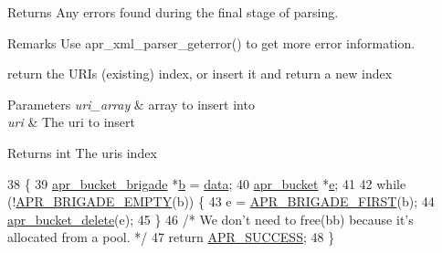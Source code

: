 \begin{DoxyReturn}{Returns}
Any errors found during the final stage of parsing. 
\end{DoxyReturn}
\begin{DoxyRemark}{Remarks}
Use apr\+\_\+xml\+\_\+parser\+\_\+geterror() to get more error information.
\end{DoxyRemark}
return the U\+RI\textquotesingle{}s (existing) index, or insert it and return a new index 
\begin{DoxyParams}{Parameters}
{\em uri\+\_\+array} & array to insert into \\
\hline
{\em uri} & The uri to insert \\
\hline
\end{DoxyParams}
\begin{DoxyReturn}{Returns}
int The uri\textquotesingle{}s index 
\end{DoxyReturn}

\begin{DoxyCode}
38 \{
39     \hyperlink{structapr__bucket__brigade}{apr\_bucket\_brigade} *\hyperlink{group__APACHE__CORE__PROTO_ga7fa09c5c80a7d25b74511944f5949e31}{b} = \hyperlink{group__APACHE__CORE__LOG_gae4950db1dbfff8459a712737063b61aa}{data};
40     \hyperlink{structapr__bucket}{apr\_bucket} *\hyperlink{group__APR__Util__Bucket__Brigades_gacd90314acb2c2e5cd19681136c08efac}{e};
41 
42     \textcolor{keywordflow}{while} (!\hyperlink{group__APR__Util__Bucket__Brigades_ga836f61da6cce15074eff257ce4b6fc0f}{APR\_BRIGADE\_EMPTY}(b)) \{
43         e = \hyperlink{group__APR__Util__Bucket__Brigades_gab5826a11eb6ba90786a94282f806c230}{APR\_BRIGADE\_FIRST}(b);
44         \hyperlink{group__APR__Util__Bucket__Brigades_ga8925c02a7f95e8c1c3986294d4678797}{apr\_bucket\_delete}(e);
45     \}
46     \textcolor{comment}{/* We don't need to free(bb) because it's allocated from a pool. */}
47     \textcolor{keywordflow}{return} \hyperlink{group__apr__errno_ga9ee311b7bf1c691dc521d721339ee2a6}{APR\_SUCCESS};
48 \}
\end{DoxyCode}
